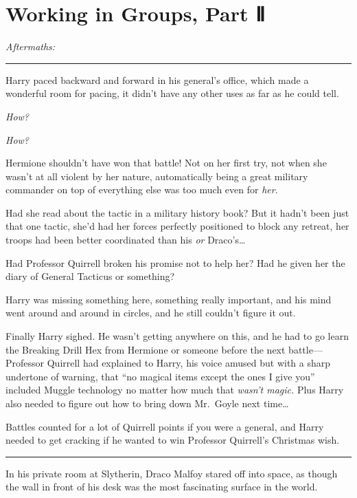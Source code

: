 \chapter{Working in Groups, Part Ⅱ}

\emph{Aftermaths:}

\begin{center}\rule{3in}{0.4pt}\end{center}

Harry paced backward and forward in his general's office, which made a
wonderful room for pacing, it didn't have any other uses as far as he
could tell.

\emph{How?}

\emph{How?}

Hermione shouldn't have won that battle! Not on her first try, not when
she wasn't at all violent by her nature, automatically being a great
military commander on top of everything else was too much even for
\emph{her}.

Had she read about the tactic in a military history book? But it hadn't
been just that one tactic, she'd had her forces perfectly positioned to
block any retreat, her troops had been better coordinated than his
\emph{or} Draco's\ldots{}

Had Professor Quirrell broken his promise not to help her? Had he given
her the diary of General Tacticus or something?

Harry was missing something here, something really important, and his
mind went around and around in circles, and he still couldn't figure it
out.

Finally Harry sighed. He wasn't getting anywhere on this, and he had to
go learn the Breaking Drill Hex from Hermione or someone before the next
battle---Professor Quirrell had explained to Harry, his voice amused but
with a sharp undertone of warning, that ``no magical items except the
ones I give you'' included Muggle technology no matter how much that
\emph{wasn't magic.} Plus Harry also needed to figure out how to bring
down Mr.~Goyle next time\ldots{}

Battles counted for a lot of Quirrell points if you were a general, and
Harry needed to get cracking if he wanted to win Professor Quirrell's
Christmas wish.

\begin{center}\rule{3in}{0.4pt}\end{center}

In his private room at Slytherin, Draco Malfoy stared off into space, as
though the wall in front of his desk was the most fascinating surface in
the world.

